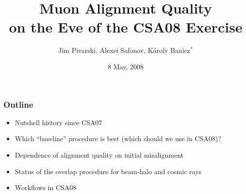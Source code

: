 \documentclass[compress]{beamer}
\title{Muon Alignment Quality \\ on the Eve of the CSA08 Exercise}
\author{Jim Pivarski, Alexei Safonov, K\'aroly Banicz$^*$}
\institute{Texas A\&M University, $^*$FermiLab}
\date{ 8 May, 2008}
\begin{document}
\frame{\titlepage}


\begin{frame}
\frametitle{Outline}
\begin{itemize}\setlength{\itemsep}{0.75 cm}
\item Nutshell history since CSA07
\item Which ``baseline'' procedure is best (which should we use in CSA08)?
\item Dependence of alignment quality on initial misalignment
\item Status of the overlap procedure for beam-halo and cosmic rays
\item Workflows in CSA08
\end{itemize}
\end{frame}
\end{document}
